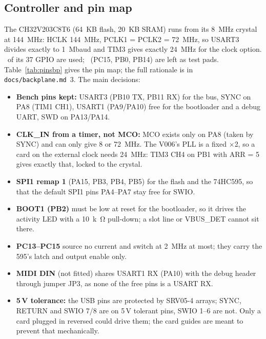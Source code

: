 \documentclass[11pt,a4paper]{article}
\newcommand{\file}[1]{\texttt{#1}}
\begin{document}
\subsection{Controller and pin map}
The CH32V203C8T6 (\SI{64}{KB} flash, \SI{20}{KB} SRAM) runs from its \SI{8}{MHz} crystal at \SI{144}{MHz}: HCLK
\SI{144}{MHz}, PCLK1 = PCLK2 = \SI{72}{MHz}, so USART3 divides exactly to \SI{1}{Mbaud} and TIM3 gives exactly
\SI{24}{MHz} for the clock option. \statBpGpioUsed\ of its 37 GPIO are used; \statBpGpioFree\ (PC15, PB0, PB14) are
left as test pads. Table~\ref{tab:pinsbp} gives the pin map; the full rationale is in \file{docs/backplane.md}~3.
The main decisions:
\begin{itemize}
  \item \textbf{Bench pins kept:} USART3 (PB10 TX, PB11 RX) for the bus, SYNC on PA8 (TIM1 CH1), USART1 (PA9/PA10)
    free for the bootloader and a debug UART, SWD on PA13/PA14.
  \item \textbf{CLK\_IN from a timer, not MCO:} MCO exists only on PA8 (taken by SYNC) and can only give 8 or
    \SI{72}{MHz}. The V006's PLL is a fixed $\times$2, so a card on the external clock needs \SI{24}{MHz}: TIM3 CH4 on
    PB1 with ARR = 5 gives exactly that, locked to the crystal.
  \item \textbf{SPI1 remap 1} (PA15, PB3, PB4, PB5) for the flash and the 74HC595, so that the default SPI1 pins
    PA4--PA7 stay free for SWIO.
  \item \textbf{BOOT1 (PB2)} must be low at reset for the bootloader, so it drives the activity LED with a
    \SI{10}{k\ohm} pull-down; a slot line or VBUS\_DET cannot sit there.
  \item \textbf{PC13--PC15} source no current and switch at \SI{2}{MHz} at most; they carry the 595's latch and output
    enable only.
  \item \textbf{MIDI DIN} (not fitted) shares USART1 RX (PA10) with the debug header through jumper JP3, as none of the
    free pins is a USART RX.
  \item \textbf{5\,V tolerance:} the USB pins are protected by SRV05-4 arrays; SYNC, RETURN and SWIO 7/8 are on 5\,V
    tolerant pins, SWIO 1--6 are not. Only a card plugged in reversed could drive them; the card guides are meant to
    prevent that mechanically.
\end{itemize}

\begin{table}[htbp]
\centering\scriptsize
\setlength{\tabcolsep}{2.6pt}
\caption{Controller (CH32V203C8T6, LQFP-48) pin map: nets from \file{hw/backplane.py}, port names from the KiCad
symbol; generated.}\label{tab:pinsbp}

\end{table}
\end{document}
